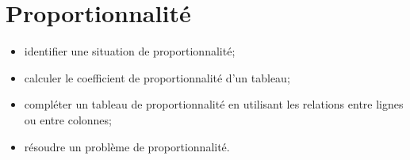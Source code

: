 \chapter{Proportionnalité}\label{ChProportionnalite}

\vspace{5cm}
\begin{acquis}
\begin{itemize}
\item identifier une situation de proportionnalité;
\item calculer le coefficient de proportionnalité d’un tableau;
\item compléter un tableau de proportionnalité en utilisant les relations entre lignes ou entre colonnes;
\item résoudre un problème de proportionnalité.
\end{itemize}
\end{acquis}


\activites



\cours


\exercicesbase
\begin{colonne*exercice}

\end{colonne*exercice}


\exercicesappr
\begin{colonne*exercice}

\end{colonne*exercice}

\connaissances


\TravauxPratiques %


\pagebreak

\recreation



